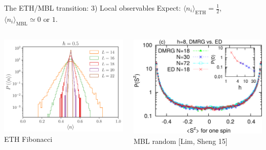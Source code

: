 \begin{frame}{The ETH/MBL transition: 3) Local observables}
Expect: \textcolor{comp}{$\langle n_i \rangle_\text{ETH} = \frac{1}{2}$}, \textcolor{BostonBlue}{$\langle n_i \rangle_\text{MBL} \simeq 0 \text{ or } 1$}.
\begin{columns}
\begin{column}{0.33\textwidth}
\centering
\includegraphics[width=\textwidth]{img/3_Fibonacci/sz_ETH}
{\footnotesize ETH Fibonacci}
\end{column}
\begin{column}{0.33\textwidth}
\centering
\includegraphics[width=\textwidth]{img/3_Fibonacci/surface768}
{\footnotesize MBL random [Lim, Sheng 15]}

\end{column}
\end{columns}
\end{frame}
